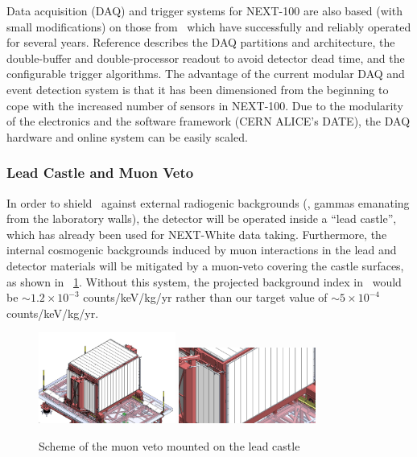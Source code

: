 
Data acquisition (DAQ) and trigger systems for NEXT-100 are also based (with small modifications) on those from \NEW\, which have successfully and reliably operated for several years. Reference \cite{Esteve:2021a} describes the DAQ partitions and architecture, the double-buffer and double-processor readout to avoid detector dead time, and the configurable trigger algorithms. The advantage of the current modular DAQ and event detection system is that it has been dimensioned from the beginning to cope with the increased number of sensors in NEXT-100. Due to the modularity of the electronics and the software framework (CERN ALICE's DATE), the DAQ hardware and online system can be easily scaled.

\subsubsection{Lead Castle and Muon Veto}

In order to shield  \Next\ against external radiogenic backgrounds (\ie, gammas emanating from the laboratory walls), the detector will be operated inside a ``lead castle'', which has already been used for NEXT-White data taking. Furthermore, the internal cosmogenic backgrounds induced by muon interactions in the lead and detector materials will be mitigated by a muon-veto covering the castle surfaces, as shown in \fig\ \ref{fig.muonveto}.  Without this system, the projected background index in \Next\ would be $\sim1.2\times10^{-3}$ counts/keV/kg/yr rather than our target value of $\sim5\times10^{-4}$ counts/keV/kg/yr.   

\begin{figure}[htbp!]
\centering
\includegraphics[width=0.4\textwidth]{img2/MuonVeto_1.JPG}
\includegraphics[width=0.4\textwidth]{img2/MuonVeto_2.JPG}
\caption{\small Scheme of the muon veto mounted on the lead castle}
\label{fig.muonveto}
\end{figure}

